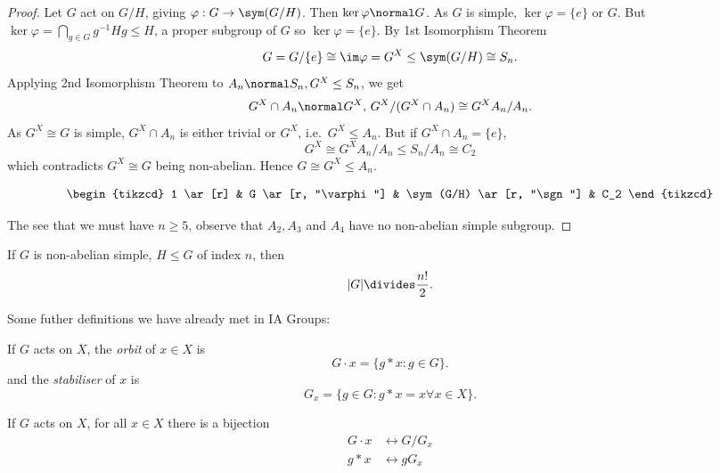 \documentclass[a4paper]{article}
\begin{document}
\begin{proof}
  Let \(G\) act on \(G/H\), giving \(\varphi: G \to \sym(G/H)\). Then \(\ker \varphi \normal G\). As \(G\) is simple, \(\ker \varphi = \{e\}\) or \(G\). But \(\ker \varphi = \bigcap_{g \in G} g^{-1}Hg \leq H\), a proper subgroup of \(G\) so \(\ker \varphi = \{e\}\). By 1st Isomorphism Theorem
  \[
    G = G/\{e\} \cong \im \varphi = G^X \leq \sym(G/H) \cong S_n.
  \]
  Applying 2nd Isomorphism Theorem to \(A_n \normal S_n, G^X \leq S_n\), we get
  \[
    G^X \cap A_n \normal G^X, \, G^X/(G^X \cap A_n) \cong G^XA_n/A_n.
  \]
  As \(G^X \cong G\) is simple, \(G^X \cap A_n\) is either trivial or \(G^X\), i.e.\ \(G^X \leq A_n\). But if \(G^X \cap A_n = \{e\}\),
  \[
    G^X \cong G^XA_n/A_n \leq S_n/A_n \cong C_2
  \]
  which contradicts \(G^X \cong G\) being non-abelian. Hence \(G \cong G^X \leq A_n\).

  \[
    \begin{tikzcd}
      1 \ar[r] & G \ar[r, "\varphi"] & \sym(G/H) \ar[r, "\sgn"] & C_2
    \end{tikzcd}
  \]
  
  The see that we must have \(n \geq 5\), observe that \(A_2, A_3\) and \(A_4\) have no non-abelian simple subgroup.
\end{proof}

\begin{corollary}
  If \(G\) is non-abelian simple, \(H \leq G\) of index \(n\), then
  \[
    |G| \divides \frac{n!}{2}.
  \]
\end{corollary}

Some futher definitions we have already met in IA Groups:

\begin{definition}
  If \(G\) acts on \(X\), the \emph{orbit} of \(x \in X\) is
  \[
    G \cdot x = \{g * x: g \in G\}.
  \]
  and the \emph{stabiliser} of \(x\) is
  \[
    G_x = \{g \in G: g * x = x \forall x \in X\}.
  \]
\end{definition}

\begin{theorem}
  \label{thm:orbit-stabiliser}
  If \(G\) acts on \(X\), for all \(x \in X\) there is a bijection
  \begin{align*}
    G \cdot x &\leftrightarrow G/G_x \\
    g * x &\leftrightarrow gG_x
  \end{align*}
\end{theorem}
\end{document}
